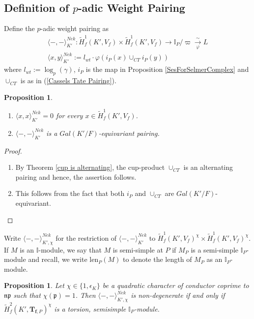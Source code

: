 \documentclass[reqno,10pt]{amsart}
\newcommand{\I}{\mathbb{I}}
\newcommand{\p}{\mathfrak{p}}
\newcommand{\n}{\mathfrak{n}}
\newcommand{\ip}{\I_P}
\newcommand{\tfp}{\mathbf{T}_{\mathbf{f},P}}
\theoremstyle{plain}
\newtheorem{prop}[thm]{Proposition}
\theoremstyle{definition}
\begin{document}
\subsection{Definition of $p$-adic Weight Pairing} 
Define the $p$-adic weight pairing as
\begin{align*} 
    \langle -,- \rangle^{Nek}_{K'} : \widetilde{H}^1_f(K',V_f) \times \widetilde{H}^1_f(K',V_f) \rightarrow \ip/\varpi \xrightarrow[\varphi]{\sim} L \\
    \langle x,y \rangle^{Nek}_{K'} :=  l_{wt} \cdot \varphi(i_P(x) \cup_{CT} i_P(y))
\end{align*}
where $l_{wt} := \log_p(\gamma)$, $i_P$ is the map in Proposition \ref{SesForSelmerComplex} and $\cup_{CT}$ is as in (\ref{Cassels Tate Pairing}).

\begin{prop} \label{NonDegeneracyOfPairing}
    \begin{enumerate}
        \item $\langle x,x \rangle^{Nek}_{K'} = 0$ for every $x \in \widetilde{H}^1_f(K',V_f)$.

        \item $\langle -,- \rangle^{Nek}_{K'}$ is a $Gal(K'/F)$-equivariant pairing.
    \end{enumerate}
\end{prop}

\begin{proof}
    \begin{enumerate}
        \item By Theorem \ref{cup is alternating}, the cup-product $\cup_{CT}$ is an alternating pairing and hence, the assertion follows.
        \item This follows from the fact that both $i_P$ and $\cup_{CT}$ are $Gal(K'/F)$-equivariant.
    \end{enumerate}
\end{proof}

Write $\langle -,- \rangle^{Nek}_{K',\chi}$ for the restriction of $\langle -,- \rangle^{Nek}_{K'}$ to $\widetilde{H}^1_f(K',V_f)^\chi \times \widetilde{H}^1_f(K',V_f)^\chi$.
\\
If $M$ is an $\I$-module, we say that $M$ is semi-simple at $P$ if $M_P$ is a semi-simple $\ip$-module and recall, we write $\mathrm{len}_P(M)$ to denote the length of $M_P$ as an $\ip$-module.

\begin{prop}
    Let $\chi \in \{1,\epsilon_K\}$ be a quadratic character of conductor coprime to $\n\p$ such that $\chi(\p) = 1$. Then $\langle -,- \rangle^{Nek}_{K',\chi}$ is non-degenerate if and only if $\widetilde{H}^2_f(K',\tfp)^\chi$ is a torsion, semisimple $\ip$-module.
\end{prop}
\end{document}
